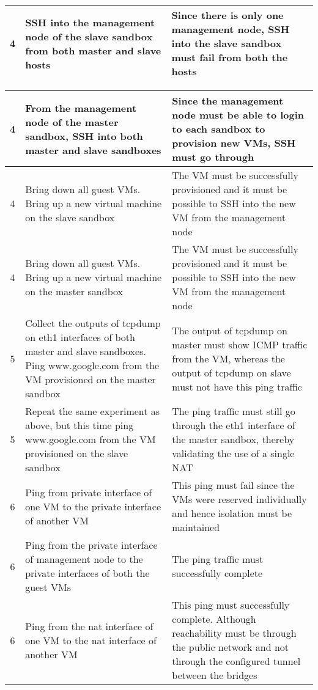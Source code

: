 \documentclass[12pt]{extarticle}
\begin{document}
\begin{center}
\begin{table}[H]
\begin{tabular}{||c  | p{0.5\linewidth} | p{0.5\linewidth} ||}
     \hline
     4 & SSH into the management node of the slave sandbox from both master and slave hosts & Since there is only one management node, SSH into the slave sandbox must fail from both the hosts \\
     \hline 
     \end{tabular}
     \end{table}
     
     \begin{table}[H]

     \begin{tabular}{||c  | p{0.5\linewidth} | p{0.5\linewidth} ||}
     \hline
     4 & From the management node of the master sandbox, SSH into both master and slave sandboxes & Since the management node must be able to login to each sandbox to provision new VMs, SSH must go through \\
     \hline
     4 & Bring down all guest VMs. Bring up a new virtual machine on the slave sandbox & The VM must be successfully provisioned and it must be possible to SSH into the new VM from the management node \\
     \hline
     4 & Bring down all guest VMs. Bring up a new virtual machine on the master sandbox & The VM must be successfully provisioned and it must be possible to SSH into the new VM from the management node \\
     \hline
     5 & Collect the outputs of tcpdump on eth1 interfaces of both master and slave sandboxes. Ping www.google.com from the VM provisioned on the master sandbox & The output of tcpdump on master must show ICMP traffic from the VM, whereas the output of tcpdump on slave must not have this ping traffic \\
     \hline
    5 & Repeat the same experiment as above, but this time ping www.google.com from the VM provisioned on the slave sandbox & The ping traffic must still go through the eth1 interface of the master sandbox, thereby validating the use of a single NAT \\
     \hline
    6 & Ping from private interface of one VM to the private interface of another VM & This ping must fail since the VMs were reserved individually and hence isolation must be maintained\\
    \hline
    6 & Ping from the private interface of management node to the private interfaces of both the guest VMs & The ping traffic must successfully complete \\
    \hline
    6 & Ping from the nat interface of one VM to the nat interface of another VM & This ping must successfully complete. Although reachability must be through the public network and not through the configured tunnel between the bridges \\

\end{tabular}
\end{table}
\end{center}
\end{document}
